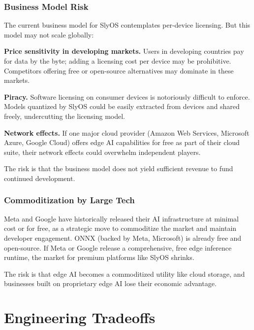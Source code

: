\documentclass[12pt, letterpaper, twoside]{report}
\begin{document}
\subsection{Business Model Risk}
\label{subsec:business_model_risk}

The current business model for SlyOS contemplates per-device licensing. But this model may not scale globally:

\textbf{Price sensitivity in developing markets.} Users in developing countries pay for data by the byte; adding a licensing cost per device may be prohibitive. Competitors offering free or open-source alternatives may dominate in these markets.

\textbf{Piracy.} Software licensing on consumer devices is notoriously difficult to enforce. Models quantized by SlyOS could be easily extracted from devices and shared freely, undercutting the licensing model.

\textbf{Network effects.} If one major cloud provider (Amazon Web Services, Microsoft Azure, Google Cloud) offers edge AI capabilities for free as part of their cloud suite, their network effects could overwhelm independent players.

The risk is that the business model does not yield sufficient revenue to fund continued development.

\subsection{Commoditization by Large Tech}
\label{subsec:commoditization_risk}

Meta and Google have historically released their AI infrastructure at minimal cost or for free, as a strategic move to commoditize the market and maintain developer engagement. ONNX (backed by Meta, Microsoft) is already free and open-source. If Meta or Google release a comprehensive, free edge inference runtime, the market for premium platforms like SlyOS shrinks.

The risk is that edge AI becomes a commoditized utility like cloud storage, and businesses built on proprietary edge AI lose their economic advantage.

\chapter{Engineering Tradeoffs}
\label{ch:tradeoffs}
\end{document}
